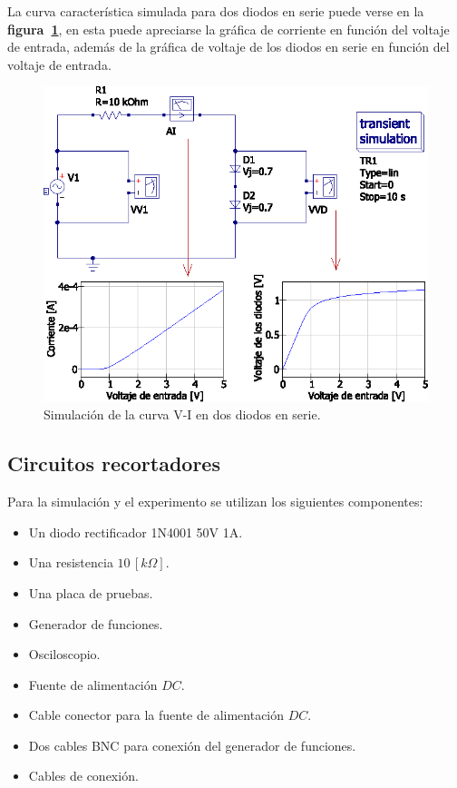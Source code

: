 \documentclass[letter,twoside,11pt]{article}
\begin{document}
La curva característica simulada para dos diodos en serie puede verse en la
\textbf{figura~\ref{simulacion1}}, en esta puede apreciarse la gráfica de
corriente en función del voltaje de entrada, además de la gráfica de voltaje de
los diodos en serie en función del voltaje de entrada.

\begin{figure}[!h]
\centering
\includegraphics[scale=0.97]{simulacion/practica1.1.eps}
\caption{Simulación de la curva V-I en dos diodos en serie.}
\label{simulacion1}
\end{figure}

\subsection{Circuitos recortadores}
Para la simulación y el experimento se utilizan los siguientes componentes:

\begin{itemize}
    \item Un diodo rectificador 1N4001 50V 1A.
    \item Una resistencia $10\,[k\Omega]$.
    \item Una placa de pruebas.
    \item Generador de funciones.
    \item Osciloscopio.
    \item Fuente de alimentación $DC$.
    \item Cable conector para la fuente de alimentación $DC$.
    \item Dos cables BNC para conexión del generador de funciones.
    \item Cables de conexión.
\end{itemize}
\end{document}
